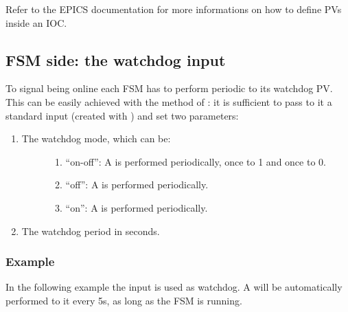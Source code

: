 \documentclass[letterpaper,10pt,english]{sphinxmanual}
\begin{document}
Refer to the EPICS documentation for more informations on how to define PVs
inside an IOC.


\subsection{FSM side: the watchdog input}
\label{\detokenize{watchdog:fsm-side-the-watchdog-input}}
To signal being online each FSM has to perform periodic {\hyperref[\detokenize{io:put}]{}} to its
watchdog PV. This can be easily achieved with the {\hyperref[\detokenize{fsm:setWatchdogInput}]{}}
method of {\hyperref[\detokenize{fsm:fsmBase}]{}}: it is sufficient to pass to it a standard input
(created with {\hyperref[\detokenize{fsm:connect}]{}}) and set two parameters:
\begin{enumerate}
\item {} \begin{description}
\item[{The watchdog mode, which can be:}] \leavevmode\begin{enumerate}
\item {} 
“on-off”: A  is performed periodically, once to 1 and once to 0.

\item {} 
“off”: A  is performed periodically.

\item {} 
“on”: A  is performed periodically.

\end{enumerate}

\end{description}

\item {} 
The watchdog period in seconds.

\end{enumerate}


\subsubsection{Example}
\label{\detokenize{watchdog:example}}
In the following example the input  is used as watchdog. A 
will be automatically performed to it every 5s, as long as the FSM is running.
\end{document}
